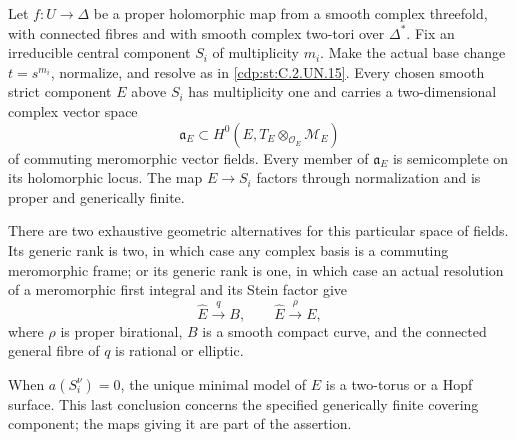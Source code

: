 \begin{proposition}\label{cdp:st:C.2.UN.16}

Let $f:U\to\Delta$ be a proper holomorphic map from a smooth
complex threefold, with connected fibres and with smooth complex
two-tori over $\Delta^*$. Fix an irreducible central component $S_i$
of multiplicity $m_i$. Make the actual base change $t=s^{m_i}$,
normalize, and resolve as in \ref{cdp:st:C.2.UN.15}. Every chosen smooth strict
component $E$ above $S_i$ has multiplicity one and carries a
two-dimensional complex vector space
\[
 \mathfrak a_E\subset
 H^0(E,T_E\otimes_{\mathcal O_E}\mathcal M_E)
 \tag{C.CF.1}\label{cdp:eq:C.CF.1}
\]
of commuting meromorphic vector fields. Every member of
$\mathfrak a_E$ is semicomplete on its holomorphic locus.
The map $E\to S_i$ factors through normalization and is
proper and generically finite.

There are two exhaustive geometric alternatives for this particular
space of fields. Its generic rank is two, in which case any complex
basis is a commuting meromorphic frame; or its generic rank is one,
in which case an actual resolution of a meromorphic first integral
and its Stein factor give
\[
 \widehat E\xrightarrow{\ q\ }B,
 \qquad \widehat E\xrightarrow{\rho}E,
 \tag{C.CF.2}\label{cdp:eq:C.CF.2}
\]
where $\rho$ is proper birational, $B$ is a smooth compact curve,
and the connected general fibre of $q$ is rational or elliptic.

When $a(S_i^\nu)=0$, the unique minimal model of $E$ is a
two-torus or a Hopf surface. This last conclusion concerns the
specified generically finite covering component; the maps giving
it are part of the assertion.
\end{proposition}

